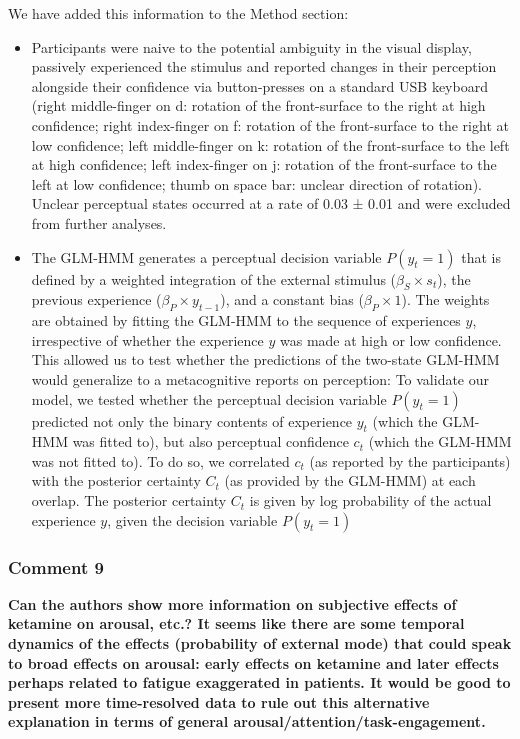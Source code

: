 \documentclass[
]{article}
\begin{document}
We have added this information to the Method section:

\begin{itemize}
\item
  Participants were naive to the potential ambiguity in the visual
  display, passively experienced the stimulus and reported changes in
  their perception alongside their confidence via button-presses on a
  standard USB keyboard (right middle-finger on d: rotation of the
  front-surface to the right at high confidence; right index-finger on
  f: rotation of the front-surface to the right at low confidence; left
  middle-finger on k: rotation of the front-surface to the left at high
  confidence; left index-finger on j: rotation of the front-surface to
  the left at low confidence; thumb on space bar: unclear direction of
  rotation). Unclear perceptual states occurred at a rate of 0.03 ± 0.01
  and were excluded from further analyses.
\item
  The GLM-HMM generates a perceptual decision variable \(P(y_t = 1)\)
  that is defined by a weighted integration of the external stimulus
  (\(\beta_S \times s_t\)), the previous experience
  (\(\beta_P \times y_{t-1}\)), and a constant bias
  (\(\beta_P \times 1\)). The weights are obtained by fitting the
  GLM-HMM to the sequence of experiences \(y\), irrespective of whether
  the experience \(y\) was made at high or low confidence. This allowed
  us to test whether the predictions of the two-state GLM-HMM would
  generalize to a metacognitive reports on perception: To validate our
  model, we tested whether the perceptual decision variable
  \(P(y_t = 1)\) predicted not only the binary contents of experience
  \(y_t\) (which the GLM-HMM was fitted to), but also perceptual
  confidence \(c_t\) (which the GLM-HMM was not fitted to). To do so, we
  correlated \(c_t\) (as reported by the participants) with the
  posterior certainty \(C_t\) (as provided by the GLM-HMM) at each
  overlap. The posterior certainty \(C_t\) is given by log probability
  of the actual experience \(y\), given the decision variable
  \(P(y_t = 1)\)
\end{itemize}

\subsubsection{Comment 9}\label{comment-9}

\textbf{Can the authors show more information on subjective effects of
ketamine on arousal, etc.? It seems like there are some temporal
dynamics of the effects (probability of external mode) that could speak
to broad effects on arousal: early effects on ketamine and later effects
perhaps related to fatigue exaggerated in patients. It would be good to
present more time-resolved data to rule out this alternative explanation
in terms of general arousal/attention/task-engagement.}
\end{document}
